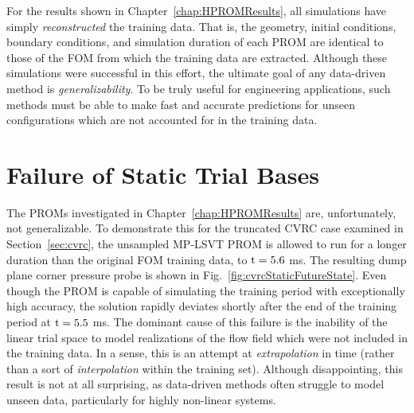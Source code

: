 For the results shown in Chapter~\ref{chap:HPROMResults}, all simulations have simply \textit{reconstructed} the training data. That is, the geometry, initial conditions, boundary conditions, and simulation duration of each PROM are identical to those of the FOM from which the training data are extracted. Although these simulations were successful in this effort, the ultimate goal of any data-driven method is \textit{generalizability}. To be truly useful for engineering applications, such methods must be able to make fast and accurate predictions for unseen configurations which are not accounted for in the training data. 

\section{Failure of Static Trial Bases}

The PROMs investigated in Chapter~\ref{chap:HPROMResults} are, unfortunately, not generalizable. To demonstrate this for the truncated CVRC case examined in Section~\ref{sec:cvrc}, the unsampled MP-LSVT PROM is allowed to run for a longer duration than the original FOM training data, to $\text{t} = 5.6$ ms. The resulting dump plane corner pressure probe is shown in Fig.~\ref{fig:cvrcStaticFutureState}. Even though the PROM is capable of simulating the training period with exceptionally high accuracy, the solution rapidly deviates shortly after the end of the training period at $\text{t} = 5.5$ ms. The dominant cause of this failure is the inability of the linear trial space to model realizations of the flow field which were not included in the training data. In a sense, this is an attempt at \textit{extrapolation} in time (rather than a sort of \textit{interpolation} within the training set). Although disappointing, this result is not at all surprising, as data-driven methods often struggle to model unseen data, particularly for highly non-linear systems.

